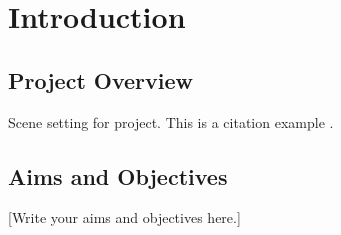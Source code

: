 \chapter{Introduction}

\section{Project Overview}
Scene setting for project.
This is a citation example \citep{Smith2020}.

\section{Aims and Objectives}
[Write your aims and objectives here.]
